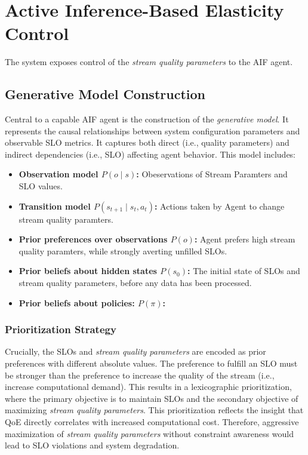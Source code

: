 \section{Active Inference-Based Elasticity Control}
The system exposes control of the \textit{stream quality parameters} to the AIF agent.
\subsection{Generative Model Construction}
Central to a capable AIF agent is the construction of the \textit{generative model}. It represents the causal relationships between system configuration parameters and observable SLO metrics. It captures both direct (i.e., quality parameters) and indirect dependencies (i.e., SLO) affecting agent behavior. This model includes:
\begin{itemize}
  \item \textbf{Observation model \(P(o \mid s)\):} Obeservations of Stream Paramters and SLO values.
  \item \textbf{Transition model \(P(s_{t+1} \mid s_t,a_t)\):} Actions taken by Agent to change stream quality paramters.
  \item \textbf{Prior preferences over observations \(P(o)\):} Agent prefers high stream quality paramters, while strongly averting unfilled SLOs.
  \item \textbf{Prior beliefs about hidden states \(P(s_0)\):} The initial state of SLOs and stream quality parameters, before any data has been processed.
  \item \textbf{Prior beliefs about policies: \(P(\pi)\):} 
\end{itemize}

\subsubsection{Prioritization Strategy}
Crucially, the SLOs and \textit{stream quality parameters} are encoded as prior preferences with different absolute values. The preference to fulfill an SLO must be stronger than the preference to increase the quality of the stream (i.e., increase computational demand). This results in a lexicographic prioritization, where the primary objective is to maintain SLOs and the secondary objective of maximizing \textit{stream quality parameters}. This prioritization reflects the insight that QoE directly correlates with increased computational cost. Therefore, aggressive maximization of \textit{stream quality parameters} without constraint awareness would lead to SLO violations and system degradation.

